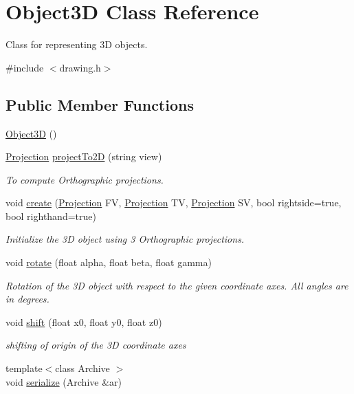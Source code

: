 \hypertarget{class_object3_d}{}\section{Object3D Class Reference}
\label{class_object3_d}


Class for representing 3D objects.  




{\ttfamily \#include $<$drawing.\+h$>$}

\subsection*{Public Member Functions}
\begin{DoxyCompactItemize}
\item 
\hyperlink{class_object3_d_ae3a1b17fb43ab59f5cf7b0ee21b9120b}{Object3D} ()
\item 
\hyperlink{class_projection}{Projection} \hyperlink{class_object3_d_a1bbc165233d95da2e78a60e6aeaaa146}{project\+To2D} (string view)
\begin{DoxyCompactList}\small\item\em To compute Orthographic projections. \end{DoxyCompactList}\item 
void \hyperlink{class_object3_d_a05fabe70eda7b69715bd1bd2be7d057a}{create} (\hyperlink{class_projection}{Projection} FV, \hyperlink{class_projection}{Projection} TV, \hyperlink{class_projection}{Projection} SV, bool rightside=true, bool righthand=true)
\begin{DoxyCompactList}\small\item\em Initialize the 3D object using 3 Orthographic projections. \end{DoxyCompactList}\item 
void \hyperlink{class_object3_d_a41145f9464fe060f1d3b1b3c5cd82a2d}{rotate} (float alpha, float beta, float gamma)
\begin{DoxyCompactList}\small\item\em Rotation of the 3D object with respect to the given coordinate axes. All angles are in degrees. \end{DoxyCompactList}\item 
void \hyperlink{class_object3_d_a9021a3005a02adbf6160694ec63fe273}{shift} (float x0, float y0, float z0)
\begin{DoxyCompactList}\small\item\em shifting of origin of the 3D coordinate axes \end{DoxyCompactList}\item 
{\footnotesize template$<$class Archive $>$ }\\void \hyperlink{class_object3_d_ad8d27fdb690f67771e6863a42eca7ae4}{serialize} (Archive \&ar)
\end{DoxyCompactItemize}
